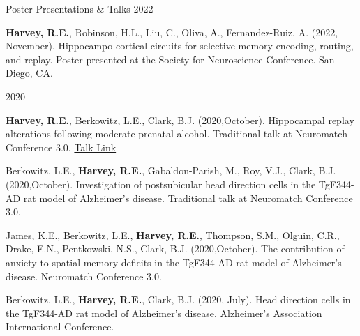 

\begin{cventries}
\cventry
    {Poster Presentations \& Talks} %
    {} %
    {} %
    {2022} %
    {
      \begin{cvitems} %
        \setlength\itemsep{0.35em}
        \item {\textbf{Harvey, R.E.}, Robinson, H.L., Liu, C., Oliva, A., Fernandez-Ruiz, A. (2022, November). Hippocampo-cortical circuits for selective memory encoding, routing, and replay. Poster presented at the Society for Neuroscience Conference. San Diego, CA.}
      \end{cvitems}
    }
\end{cventries}

\begin{cventries}
\cventry
    {} %
    {} %
    {} %
    {2020} %
    {
      \begin{cvitems} %
        \setlength\itemsep{0.35em}
        \item {\textbf{Harvey, R.E.}, Berkowitz, L.E., Clark, B.J. (2020,October). Hippocampal replay alterations following moderate prenatal alcohol. Traditional talk at Neuromatch Conference 3.0. \href{https://www.youtube.com/watch?v=YlsuJasxjjg&t=5s&ab_channel=NeuromatchConference}{Talk Link}}
        \item {Berkowitz, L.E., \textbf{Harvey, R.E.}, Gabaldon-Parish, M., Roy, V.J., Clark, B.J. (2020,October). Investigation of postsubicular head direction cells in the TgF344-AD rat model of Alzheimer’s disease. Traditional talk at Neuromatch Conference 3.0.}
        \item {James, K.E., Berkowitz, L.E., \textbf{Harvey, R.E.}, Thompson, S.M., Olguin, C.R., Drake, E.N., Pentkowski, N.S., Clark, B.J. (2020,October). The contribution of anxiety to spatial memory deficits in the TgF344-AD rat model of Alzheimer’s disease. Neuromatch Conference 3.0.}
        \item {Berkowitz, L.E., \textbf{Harvey, R.E.}, Clark, B.J. (2020, July). Head direction cells in the TgF344-AD rat model of Alzheimer's disease. Alzheimer's Association International Conference.}      
      \end{cvitems}
    }
\end{cventries}
    

